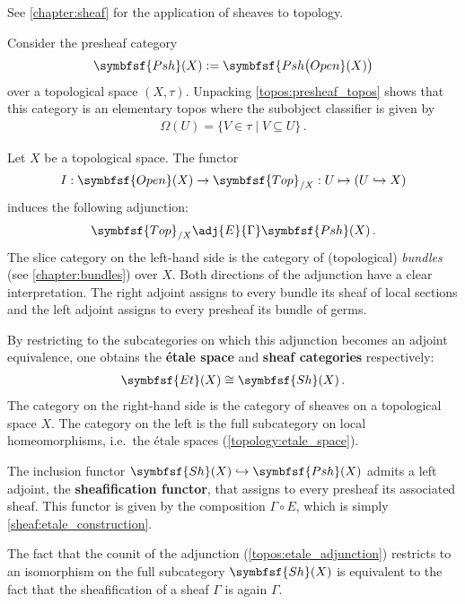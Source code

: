     See \cref{chapter:sheaf} for the application of sheaves to topology.

    \begin{property}\label{topos:sheaf_topos}
        Consider the presheaf category
        \begin{gather}
            \symbfsf{Psh}(X):=\symbfsf{Psh\bigl(Open}(X)\bigr)
        \end{gather}
        over a topological space $(X,\tau)$. Unpacking \cref{topos:presheaf_topos} shows that this category is an elementary topos where the subobject classifier is given by
        \begin{gather}
            \Omega(U) = \{V\in\tau\mid V\subseteq U\}\,.
        \end{gather}
    \end{property}

    \begin{construct}\label{topos:etale_adjunction}
        Let $X$ be a topological space. The functor
        \begin{gather}
            I:\symbfsf{Open}(X)\rightarrow\symbfsf{Top}_{/X}:U\mapsto(U\hookrightarrow X)
        \end{gather}
        induces the following adjunction:
        \begin{gather}
            \symbfsf{Top}_{/X}\adj{E}{\Gamma}\symbfsf{Psh}(X)\,.
        \end{gather}
        The slice category on the left-hand side is the category of (topological) \textit{bundles} (see \cref{chapter:bundles}) over $X$. Both directions of the adjunction have a clear interpretation. The right adjoint assigns to every bundle its sheaf of local sections and the left adjoint assigns to every presheaf its bundle of germs.

        By restricting to the subcategories on which this adjunction becomes an adjoint equivalence, one obtains the \textbf{\'etale space} and \textbf{sheaf categories} respectively:
        \begin{gather}
            \symbfsf{Et}(X)\cong\symbfsf{Sh}(X)\,.
        \end{gather}
        The category on the right-hand side is the category of sheaves on a topological space $X$. The category on the left is the full subcategory on local homeomorphisms, i.e.~the \'etale spaces (\cref{topology:etale_space}).
    \end{construct}

    \begin{property}
        The inclusion functor $\symbfsf{Sh}(X)\hookrightarrow\symbfsf{Psh}(X)$ admits a left adjoint, the \textbf{sheafification functor}, that assigns to every presheaf its associated sheaf. This functor is given by the composition $\Gamma\circ E$, which is simply \cref{sheaf:etale_construction}.

        The fact that the counit of the adjunction (\cref{topos:etale_adjunction}) restricts to an isomorphism on the full subcategory $\symbfsf{Sh}(X)$ is equivalent to the fact that the sheafification of a sheaf $\Gamma$ is again $\Gamma$.
    \end{property}


